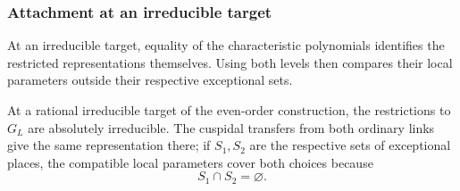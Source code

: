 \subsubsection{Attachment at an irreducible target}
\label{par:count-two-glue}

At an irreducible target, equality of the characteristic polynomials identifies the restricted representations themselves. Using both levels then compares their local parameters outside their respective exceptional sets.

\begin{proposition}\label{prop:count-two-cuspidal-attachment}
At a rational irreducible target of the even-order construction,
the restrictions to \(G_L\) are absolutely irreducible. The
cuspidal transfers from both ordinary links give the same
representation there; if \(S_1,S_2\) are the respective sets of exceptional places, the compatible local parameters cover both choices because 
\[
 S_1\cap S_2=\varnothing.
\]

\end{proposition}

